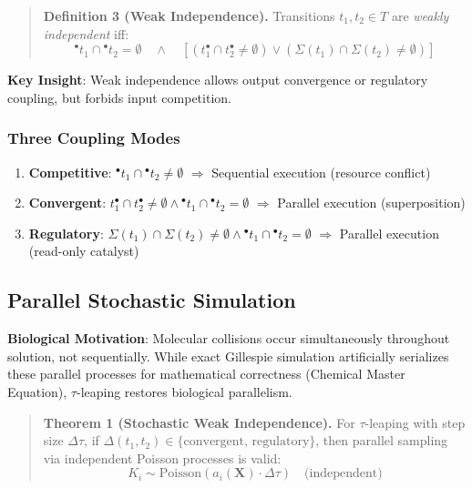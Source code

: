 \documentclass[twocolumn,11pt]{article}
\newcommand{\preset}[1]{\ensuremath{{}^{\bullet}#1}}
\newcommand{\postset}[1]{\ensuremath{#1^{\bullet}}}
\newcommand{\RegSet}[1]{\ensuremath{\Sigma(#1)}}
\newcommand{\DepType}[2]{\ensuremath{\Delta(#1,#2)}}
\begin{document}
\begin{quote}
\textbf{Definition 3 (Weak Independence).}
Transitions $t_1, t_2 \in T$ are \emph{weakly independent} iff:
\begin{equation}
\preset{t_1} \cap \preset{t_2} = \emptyset \quad \land \quad [(\postset{t_1} \cap \postset{t_2} \neq \emptyset) \lor (\RegSet{t_1} \cap \RegSet{t_2} \neq \emptyset)]
\end{equation}
\end{quote}

\textbf{Key Insight}: Weak independence allows output convergence or regulatory coupling, but forbids input competition.

\subsubsection{Three Coupling Modes}

\begin{enumerate}
    \item \textbf{Competitive}: $\preset{t_1} \cap \preset{t_2} \neq \emptyset$ $\Rightarrow$ Sequential execution (resource conflict)
    
    \item \textbf{Convergent}: $\postset{t_1} \cap \postset{t_2} \neq \emptyset \land \preset{t_1} \cap \preset{t_2} = \emptyset$ $\Rightarrow$ Parallel execution (superposition)
    
    \item \textbf{Regulatory}: $\RegSet{t_1} \cap \RegSet{t_2} \neq \emptyset \land \preset{t_1} \cap \preset{t_2} = \emptyset$ $\Rightarrow$ Parallel execution (read-only catalyst)
\end{enumerate}

\subsection{Parallel Stochastic Simulation}

\textbf{Biological Motivation}: Molecular collisions occur simultaneously throughout solution, not sequentially. While exact Gillespie simulation artificially serializes these parallel processes for mathematical correctness (Chemical Master Equation), $\tau$-leaping restores biological parallelism.

\begin{quote}
\textbf{Theorem 1 (Stochastic Weak Independence).}
For $\tau$-leaping with step size $\Delta\tau$, if $\DepType{t_1}{t_2} \in \{\text{convergent, regulatory}\}$, then parallel sampling via independent Poisson processes is valid:
\begin{equation}
K_i \sim \text{Poisson}(a_i(\mathbf{X}) \cdot \Delta\tau) \quad \text{(independent)}
\end{equation}
\end{quote}
\end{document}
